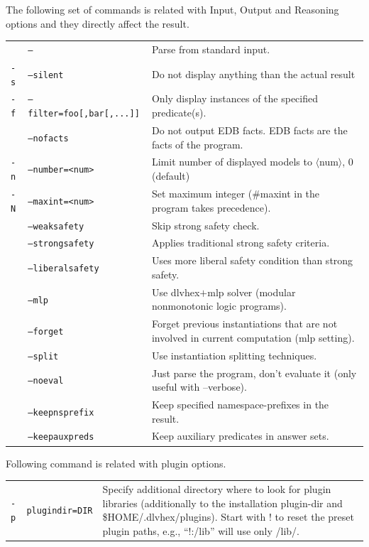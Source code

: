 \documentclass[14pt,a4paper, titlepage]{article}
\begin{document}
\bigskip
The following set of commands is related with Input, Output and  Reasoning options and they directly affect the result.
\renewcommand{\arraystretch}{2}
\begin{center}
\begin{tabular}{  p{1cm}  p{4.7cm} p{6.1cm}  } 
 & \texttt{--} & Parse from standard input. \\ 
\texttt{-s} & \texttt{--silent}& Do not display anything than the actual result \\ 
\texttt{-f} & \texttt{--filter=foo[,bar[,...]]} & Only display instances of the specified predicate(s). \\
& \texttt{--nofacts} & Do not output EDB facts. EDB facts are the facts of the program.  \\
\texttt{-n} & \texttt{--number=<num>} & Limit number of displayed models to $\langle$num$\rangle$, 0 (default)\\ 
\texttt{-N} & \texttt{--maxint=<num>} & Set maximum integer (\#maxint in the program takes precedence). \\
 & \texttt{--weaksafety} & Skip strong safety check.\\
 & \texttt{--strongsafety} & Applies traditional strong safety criteria. \\
  & \texttt{--liberalsafety} & Uses more liberal safety condition than strong safety. \\
  &\texttt{--mlp}& Use dlvhex$+$mlp solver (modular nonmonotonic logic programs).\\
  & \texttt{--forget} & Forget previous instantiations that are not involved in current computation (mlp setting). \\
  & \texttt{--split} &Use instantiation splitting techniques.\\
  & \texttt{--noeval} & Just parse the program, don't evaluate it (only useful with --verbose). \\
  & \texttt{--keepnsprefix} & Keep specified namespace-prefixes in the result. \\
  & \texttt{--keepauxpreds} & Keep auxiliary predicates in answer sets. \\
\end{tabular}
\end{center}
\bigskip
Following command is related with plugin options.
\begin{center}
\begin{tabular}{  p{1cm}  p{4.7cm} p{6.1cm}  } 
 \texttt{-p}&\texttt{plugindir=DIR}&Specify additional directory where to look for plugin libraries (additionally to the installation plugin-dir and \$HOME/.dlvhex/plugins). Start with ! to reset the preset plugin paths, e.g., ``!:/lib'' will use only /lib/.
 \\
\end{tabular}
\end{center}
\end{document}
